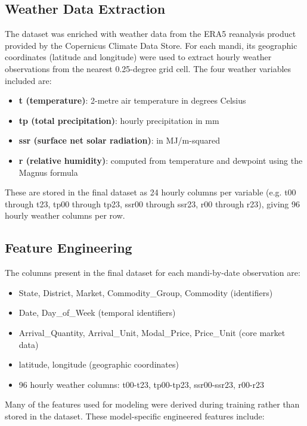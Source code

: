 \documentclass[12pt,a4paper]{article}
\begin{document}
\subsection{Weather Data Extraction}
The dataset was enriched with weather data from the ERA5 reanalysis product provided by the Copernicus Climate Data Store. For each mandi, its geographic coordinates (latitude and longitude) were used to extract hourly weather observations from the nearest 0.25-degree grid cell. The four weather variables included are:

\begin{itemize}
\item \textbf{t (temperature)}: 2-metre air temperature in degrees Celsius
\item \textbf{tp (total precipitation)}: hourly precipitation in mm
\item \textbf{ssr (surface net solar radiation)}: in MJ/m-squared
\item \textbf{r (relative humidity)}: computed from temperature and dewpoint using the Magnus formula
\end{itemize}
These are stored in the final dataset as 24 hourly columns per variable (e.g. t00 through t23, tp00 through tp23, ssr00 through ssr23, r00 through r23), giving 96 hourly weather columns per row.

\subsection{Feature Engineering}
The columns present in the final dataset for each mandi-by-date observation are:

\begin{itemize}
\item State, District, Market, Commodity\_Group, Commodity (identifiers)
\item Date, Day\_of\_Week (temporal identifiers)
\item Arrival\_Quantity, Arrival\_Unit, Modal\_Price, Price\_Unit (core market data)
\item latitude, longitude (geographic coordinates)
\item 96 hourly weather columns: t00-t23, tp00-tp23, ssr00-ssr23, r00-r23
\end{itemize}
Many of the features used for modeling were derived during training rather than stored in the dataset. These model-specific engineered features include:
\end{document}
